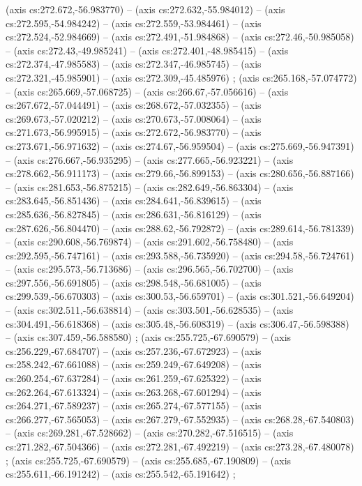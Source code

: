     (axis cs:272.672,-56.983770) --  (axis cs:272.632,-55.984012) --  (axis cs:272.595,-54.984242) --  (axis cs:272.559,-53.984461) --  (axis cs:272.524,-52.984669) --  (axis cs:272.491,-51.984868) --  (axis cs:272.46,-50.985058) --  (axis cs:272.43,-49.985241) --  (axis cs:272.401,-48.985415) --  (axis cs:272.374,-47.985583) --  (axis cs:272.347,-46.985745) --  (axis cs:272.321,-45.985901) --  (axis cs:272.309,-45.485976) ;
    (axis cs:265.168,-57.074772) --  (axis cs:265.669,-57.068725) --  (axis cs:266.67,-57.056616) --  (axis cs:267.672,-57.044491) --  (axis cs:268.672,-57.032355) --  (axis cs:269.673,-57.020212) --  (axis cs:270.673,-57.008064) --  (axis cs:271.673,-56.995915) --  (axis cs:272.672,-56.983770) --  (axis cs:273.671,-56.971632) --  (axis cs:274.67,-56.959504) --  (axis cs:275.669,-56.947391) --  (axis cs:276.667,-56.935295) --  (axis cs:277.665,-56.923221) --  (axis cs:278.662,-56.911173) --  (axis cs:279.66,-56.899153) --  (axis cs:280.656,-56.887166) --  (axis cs:281.653,-56.875215) --  (axis cs:282.649,-56.863304) --  (axis cs:283.645,-56.851436) --  (axis cs:284.641,-56.839615) --  (axis cs:285.636,-56.827845) --  (axis cs:286.631,-56.816129) --  (axis cs:287.626,-56.804470) --  (axis cs:288.62,-56.792872) --  (axis cs:289.614,-56.781339) --  (axis cs:290.608,-56.769874) --  (axis cs:291.602,-56.758480) --  (axis cs:292.595,-56.747161) --  (axis cs:293.588,-56.735920) --  (axis cs:294.58,-56.724761) --  (axis cs:295.573,-56.713686) --  (axis cs:296.565,-56.702700) --  (axis cs:297.556,-56.691805) --  (axis cs:298.548,-56.681005) --  (axis cs:299.539,-56.670303) --  (axis cs:300.53,-56.659701) --  (axis cs:301.521,-56.649204) --  (axis cs:302.511,-56.638814) --  (axis cs:303.501,-56.628535) --  (axis cs:304.491,-56.618368) --  (axis cs:305.48,-56.608319) --  (axis cs:306.47,-56.598388) --  (axis cs:307.459,-56.588580) ;
    (axis cs:255.725,-67.690579) --  (axis cs:256.229,-67.684707) --  (axis cs:257.236,-67.672923) --  (axis cs:258.242,-67.661088) --  (axis cs:259.249,-67.649208) --  (axis cs:260.254,-67.637284) --  (axis cs:261.259,-67.625322) --  (axis cs:262.264,-67.613324) --  (axis cs:263.268,-67.601294) --  (axis cs:264.271,-67.589237) --  (axis cs:265.274,-67.577155) --  (axis cs:266.277,-67.565053) --  (axis cs:267.279,-67.552935) --  (axis cs:268.28,-67.540803) --  (axis cs:269.281,-67.528662) --  (axis cs:270.282,-67.516515) --  (axis cs:271.282,-67.504366) --  (axis cs:272.281,-67.492219) --  (axis cs:273.28,-67.480078) ;
    (axis cs:255.725,-67.690579) --  (axis cs:255.685,-67.190809) --  (axis cs:255.611,-66.191242) --  (axis cs:255.542,-65.191642) ;

